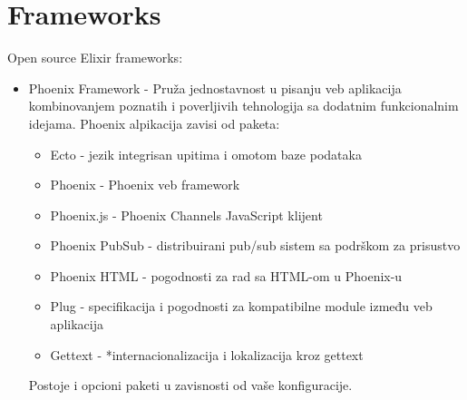 \documentclass[a4paper]{article}
\begin{document}
\section{Frameworks}
Open source Elixir frameworks:
\begin{itemize}
    \item Phoenix Framework - Pruža jednostavnost u pisanju veb aplikacija kombinovanjem poznatih i poverljivih tehnologija sa dodatnim funkcionalnim idejama. Phoenix alpikacija zavisi od paketa:
    \begin{itemize}
        \item Ecto - jezik integrisan upitima i omotom baze podataka
        \item Phoenix - Phoenix veb framework
        \item Phoenix.js - Phoenix Channels JavaScript klijent
        \item Phoenix PubSub - distribuirani pub/sub sistem sa podrškom za prisustvo
        \item Phoenix HTML - pogodnosti za rad sa HTML-om u Phoenix-u
        \item Plug - specifikacija i pogodnosti za kompatibilne module između veb aplikacija
        \item Gettext - *internacionalizacija i lokalizacija kroz gettext
    \end{itemize}
    Postoje i opcioni paketi u zavisnosti od vaše konfiguracije.


\end{itemize}
\end{document}
